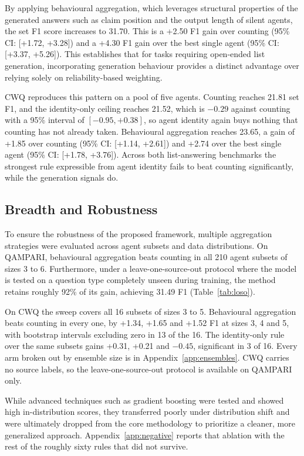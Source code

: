 \documentclass{article}
\begin{document}
By applying behavioural aggregation, which leverages structural properties of the generated answers such as claim position and the output length of silent agents, the set F1 score increases to 31.70. This is a +2.50 F1 gain over counting (95\% CI: [+1.72, +3.28]) and a +4.30 F1 gain over the best single agent (95\% CI: [+3.37, +5.26]). This establishes that for tasks requiring open-ended list generation, incorporating generation behaviour provides a distinct advantage over relying solely on reliability-based weighting.

CWQ reproduces this pattern on a pool of five agents. Counting reaches 21.81 set F1, and the identity-only ceiling reaches 21.52, which is $-0.29$ against counting with a 95\% interval of $[-0.95, +0.38]$, so agent identity again buys nothing that counting has not already taken. Behavioural aggregation reaches 23.65, a gain of +1.85 over counting (95\% CI: [+1.14, +2.61]) and +2.74 over the best single agent (95\% CI: [+1.78, +3.76]). Across both list-answering benchmarks the strongest rule expressible from agent identity fails to beat counting significantly, while the generation signals do.


\subsection{Breadth and Robustness}
\label{sec:breadth}
\label{sec:robust}

To ensure the robustness of the proposed framework, multiple aggregation strategies were evaluated across agent subsets and data distributions. On QAMPARI, behavioural aggregation beats counting in all 210 agent subsets of sizes 3 to 6. Furthermore, under a leave-one-source-out protocol where the model is tested on a question type completely unseen during training, the method retains roughly 92\% of its gain, achieving 31.49 F1 (Table~\ref{tab:loso}).

On CWQ the sweep covers all 16 subsets of sizes 3 to 5. Behavioural aggregation beats counting in every one, by +1.34, +1.65 and +1.52 F1 at sizes 3, 4 and 5, with bootstrap intervals excluding zero in 13 of the 16. The identity-only rule over the same subsets gains +0.31, +0.21 and $-0.45$, significant in 3 of 16. Every arm broken out by ensemble size is in Appendix~\ref{app:ensembles}. CWQ carries no source labels, so the leave-one-source-out protocol is available on QAMPARI only.

While advanced techniques such as gradient boosting were tested and showed high in-distribution scores, they transferred poorly under distribution shift and were ultimately dropped from the core methodology to prioritize a cleaner, more generalized approach. Appendix~\ref{app:negative} reports that ablation with the rest of the roughly sixty rules that did not survive.
\end{document}
